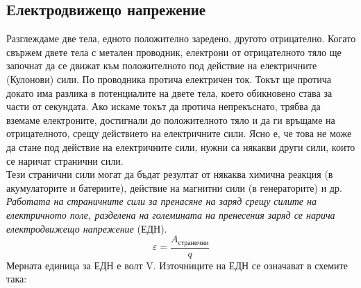 \documentclass[fleqn, 12pt]{article}
\theoremstyle{definition}
\begin{document}
\subsection{Електродвижещо напрежение}
Разглеждаме две тела, едното положително заредено,
другото отрицателно. Когато свържем двете тела с метален
проводник, електрони от отрицателното тяло ще започнат да се движат към
положителното под действие на електричните (Кулонови) сили. По проводника
протича електричен ток. Токът ще протича докато има разлика в потенциалите на двете
тела, което обикновено става за части от секундата. Ако искаме токът да протича
непрекъснато, трябва да вземаме електроните, достигнали до положителното тяло и да
ги връщаме на отрицателното, срещу действието на електричните сили. Ясно е, че това
не може да стане под действие на електричните сили, нужни са някакви други сили,
които се наричат странични сили.\\
Тези странични сили могат да бъдат резултат от някаква
химична реакция (в акумулаторите и батериите), действие на
магнитни сили (в генераторите) и др.\\
\textit{Работата на страничните сили за пренасяне на заряд
срещу силите на електричното поле, разделена на
големината на пренесения заряд се нарича електродвижещо
напрежение} (ЕДН). 
$$\varepsilon = \frac{A_{\text{странични}}}{q}$$
Мерната единица за ЕДН е волт V. Източниците на ЕДН се означават в схемите така: 
\begin{center}
\end{center}
\end{document}
